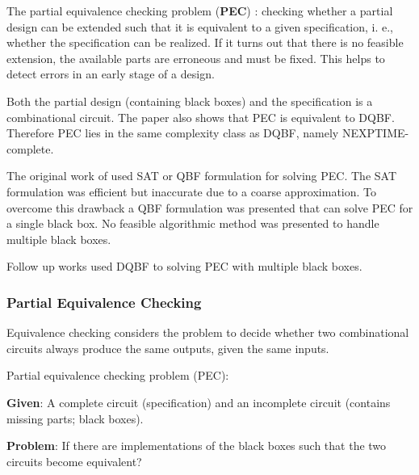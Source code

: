 \documentclass[runningheads]{llncs}
\begin{document}
The partial equivalence checking problem (\textbf{PEC}) \cite{gitinarswb13r}: checking whether a partial design can be extended
such that it is equivalent to a given specification, i. e., whether the specification can be realized.
If it turns out that there is no feasible extension, the available parts are erroneous and must be fixed. This helps to detect errors in an early stage of a design.

Both the partial design (containing black boxes) and the specification is a combinational circuit.
The paper also shows that PEC is equivalent to DQBF. Therefore PEC lies in the same complexity class as DQBF, namely NEXPTIME-complete.

The original work of \cite{schollb01} used SAT or QBF formulation for solving PEC. The SAT formulation was
efficient but inaccurate due to a coarse
approximation.
To overcome this drawback a QBF formulation was presented that can solve PEC for a single black box.
No feasible algorithmic method was presented to handle multiple black boxes.

Follow up works \cite{gitinarswb13, gitinarswb13r, wimmerws018} used DQBF to solving PEC with multiple black boxes.

\subsubsection{Partial Equivalence Checking}\label{sssec:pec}
Equivalence checking considers the problem to decide whether
two combinational circuits always produce the same outputs,
given the same inputs.

Partial equivalence checking problem (PEC):
\par\textbf{Given}: A complete circuit (specification) and an incomplete circuit (contains missing parts; black boxes).
\par\textbf{Problem}: If there are implementations of the black boxes such that the two circuits become equivalent?
\end{document}
